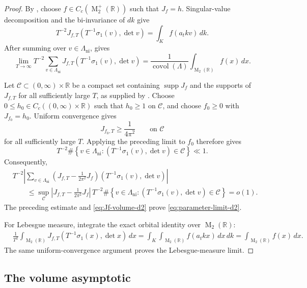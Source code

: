 \documentclass[reqno,11pt]{amsart}
\theoremstyle{definition}
\theoremstyle{remark}
\numberwithin{equation}{section}
\newcommand{\M}{\operatorname{M}}
\newcommand{\covol}{\operatorname{covol}}
\newcommand{\supp}{\operatorname{supp}}
\begin{document}
\begin{proof}
 By , choose
$f\in C_c(\M_2^+(\mathbb R))$ such that $J_f=h$. Singular-value decomposition and the
bi-invariance of $dk$ give
$$
T^{-2}
J_{f,T}\left(T^{-1}\sigma_1(v),\det v\right)
=
\int_Kf(a_tkv)\,dk.
$$
After summing over $v\in\Lambda_{\operatorname{ni}}$,
 gives
$$
\lim_{T\to\infty}
T^{-2}
\sum_{v\in\Lambda_{\operatorname{ni}}}
J_{f,T}\left(T^{-1}\sigma_1(v),\det v\right)
=
\frac{1}{\covol(\Lambda)}
\int_{\M_2(\mathbb R)}f(x)\,dx.
$$

Let $\mathcal C\subset(0,\infty)\times\mathbb R$ be a compact set
containing $\supp J_f$ and the supports of $J_{f,T}$ for all sufficiently
large $T$, as supplied by . Choose
$0\le h_0\in C_c((0,\infty)\times\mathbb R)$ such that $h_0\ge1$ on
$\mathcal C$, and choose $f_0\ge0$ with $J_{f_0}=h_0$. Uniform convergence
gives
$$
J_{f_0,T}\ge\frac{1}{4\pi^2}
\qquad\text{on }\mathcal C
$$
for all sufficiently large $T$. Applying the preceding limit to $f_0$
therefore gives
$$
T^{-2}
\#\left\{
v\in\Lambda_{\operatorname{ni}}:
\left(T^{-1}\sigma_1(v),\det v\right)\in\mathcal C
\right\}
\ll1.
$$
Consequently,
$$
\begin{aligned}
&T^{-2}
\left|
\sum_{v\in\Lambda_{\operatorname{ni}}}
\left(J_{f,T}-\frac{1}{2\pi^2}J_f\right)
\left(T^{-1}\sigma_1(v),\det v\right)
\right|\\
&\qquad\le
\sup_{\mathcal C}|J_{f,T}-\frac{1}{2\pi^2}J_f|\,
T^{-2}
\#\left\{
v\in\Lambda_{\operatorname{ni}}:
\left(T^{-1}\sigma_1(v),\det v\right)\in\mathcal C
\right\}
=o(1).
\end{aligned}
$$
The preceding estimate and \eqref{eq:Jf-volume-d2} prove
\eqref{eq:parameter-limit-d2}.


For Lebesgue measure, integrate the exact orbital identity over
$\M_2(\mathbb R)$:
$$
\begin{aligned}
&\tfrac{1}{T^2}
\int_{\M_2(\mathbb R)}
J_{f,T}\left(T^{-1}\sigma_1(x),\det x\right)\,dx=
\int_K\int_{\M_2(\mathbb R)}
f(a_tkx)\,dx\,dk
=
\int_{\M_2(\mathbb R)}f(x)\,dx.
\end{aligned}
$$
The same uniform-convergence argument proves the Lebesgue-measure limit.
\end{proof}

\subsection{The volume asymptotic}
\end{document}
